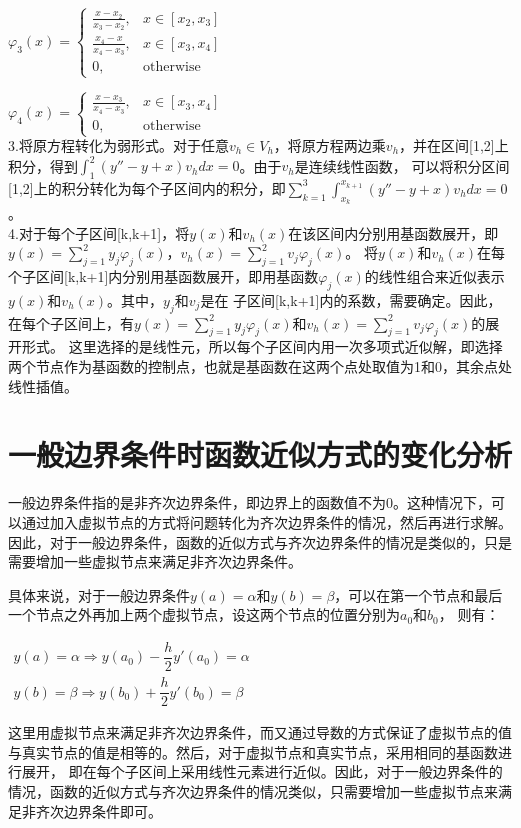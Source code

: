 \documentclass[12pt, a4paper, oneside]{ctexart}
\begin{document}
\begin{spacing}{2.0}
$\varphi_3(x)=\begin{cases}
    \frac{x-x_2}{x_3-x_2}, & x\in[x_2,x_3]\\
    \frac{x_4-x}{x_4-x_3}, & x\in[x_3,x_4]\\
    0, & \text{otherwise}
\end{cases}$

$\varphi_4(x)=\begin{cases}
    \frac{x-x_3}{x_4-x_3}, & x\in[x_3,x_4]\\
    0, & \text{otherwise}
\end{cases}$
\\
3.将原方程转化为弱形式。对于任意$v_h\in V_h$，将原方程两边乘$v_h$，并在区间[1,2]上积分，得到$\int_1^2(y''-y+x)v_hdx=0$。由于$v_h$是连续线性函数，
可以将积分区间[1,2]上的积分转化为每个子区间内的积分，即$\displaystyle\sum_{k=1}^{3}\int_{x_k}^{x_{k+1}}(y''-y+x)v_hdx=0$。
\\
4.对于每个子区间[k,k+1]，将$y(x)$和$v_h(x)$在该区间内分别用基函数展开，即$\displaystyle y(x)=\sum_{j=1}^{2}y_j\varphi_j(x)$，$ \displaystyle v_h(x)=\sum_{j=1}^{2}v_j\varphi_j(x)$。
将$y(x)$和$v_h(x)$在每个子区间[k,k+1]内分别用基函数展开，即用基函数$\varphi_j(x)$的线性组合来近似表示$y(x)$和$v_h(x)$。其中，$y_j$和$v_j$是在
子区间[k,k+1]内的系数，需要确定。因此，在每个子区间上，有$\displaystyle y(x)=\sum_{j=1}^{2}y_j\varphi_j(x)$和$\displaystyle v_h(x)=\sum_{j=1}^{2}v_j\varphi_j(x)$的展开形式。
这里选择的是线性元，所以每个子区间内用一次多项式近似解，即选择两个节点作为基函数的控制点，也就是基函数在这两个点处取值为1和0，其余点处线性插值。

\section{一般边界条件时函数近似方式的变化分析}
一般边界条件指的是非齐次边界条件，即边界上的函数值不为0。这种情况下，可以通过加入虚拟节点的方式将问题转化为齐次边界条件的情况，然后再进行求解。
因此，对于一般边界条件，函数的近似方式与齐次边界条件的情况是类似的，只是需要增加一些虚拟节点来满足非齐次边界条件。

具体来说，对于一般边界条件$y(a)=\alpha$和$y(b)=\beta$，可以在第一个节点和最后一个节点之外再加上两个虚拟节点，设这两个节点的位置分别为$a_0$和$b_0$，
则有：
\begin{center}
    $\begin{array}{c}y(a)=\alpha\Rightarrow y(a_0)-\dfrac{h}{2}y'(a_0)=\alpha\\ 
    y(b)=\beta\Rightarrow y(b_0)+\dfrac{h}{2}y'(b_0)=\beta\end{array}$
\end{center}
这里用虚拟节点来满足非齐次边界条件，而又通过导数的方式保证了虚拟节点的值与真实节点的值是相等的。然后，对于虚拟节点和真实节点，采用相同的基函数进行展开，
即在每个子区间上采用线性元素进行近似。因此，对于一般边界条件的情况，函数的近似方式与齐次边界条件的情况类似，只需要增加一些虚拟节点来满足非齐次边界条件即可。


\end{spacing}
\end{document}
